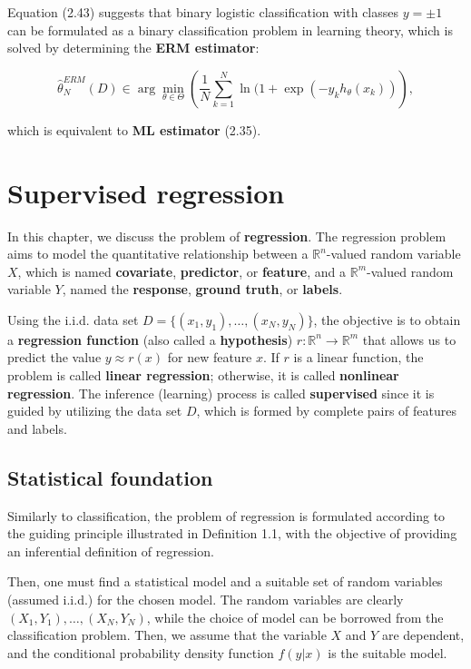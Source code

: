 \documentclass{report}
\begin{document}
Equation (2.43) suggests that binary logistic classification with classes $y=\pm 1$ can be formulated as a binary classification problem in learning theory, which is solved by determining the \textbf{ERM estimator}:

\begin{equation}
\hat{\theta}_N^{ERM}(D) \in \arg \min_{\theta \in \Theta}\left(\frac{1}{N}\sum_{k=1}^N \ln(1+\exp(-y_kh_\theta(x_k))\right),
\end{equation}

which is equivalent to \textbf{ML estimator} (2.35).

\chapter{Supervised regression}
In this chapter, we discuss the problem of \textbf{regression}. The regression problem aims to model the quantitative relationship between a $\mathbb{R}^n$-valued random variable $X$, which is named \textbf{covariate}, \textbf{predictor}, or \textbf{feature}, and a $\mathbb{R}^m$-valued random variable $Y$, named the \textbf{response}, \textbf{ground truth}, or \textbf{labels}.

Using the i.i.d. data set $D = \{(x_1,y_1),\dots,(x_N,y_N)\}$, the objective is to obtain a \textbf{regression function} (also called a \textbf{hypothesis}) $r : \mathbb{R}^n \to \mathbb{R}^m$ that allows us to predict the value $y \approx r(x)$ for new feature $x$. If $r$ is a linear function, the problem is called \textbf{linear regression}; otherwise, it is called \textbf{nonlinear regression}. The inference (learning) process is called \textbf{supervised} since it is guided by
utilizing the data set $D$, which is formed by complete pairs of features and labels.

\section{Statistical foundation}
Similarly to classification, the problem of regression is formulated according to the guiding principle illustrated in Definition 1.1, with the objective of providing an inferential definition of regression.

Then, one must find a statistical model and a suitable set of random variables (assumed i.i.d.) for the chosen model. The random variables are clearly $(X_1,Y_1),\dots,(X_N,Y_N)$, while the choice of model can be borrowed from the classification problem. Then, we assume that the variable $X$ and $Y$ are dependent, and the conditional probability density function $f(y|x)$ is the suitable model.
\end{document}
